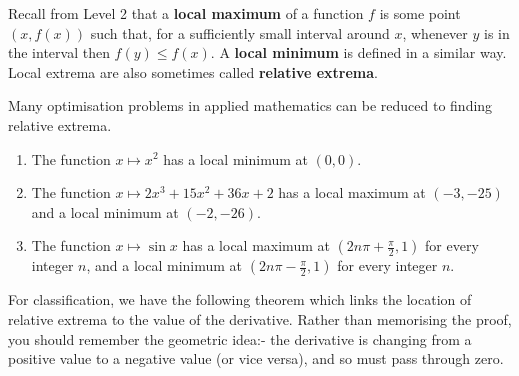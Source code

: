 


Recall from Level 2 that a \textbf{local maximum} of a function $ f $ is some point $ (x, f(x)) $ such that, for a sufficiently
small interval around $ x $, whenever $ y $ is in the interval then $ f(y) \leq f(x) $. A \textbf{local minimum} is defined in
a similar way. Local extrema are also sometimes called \textbf{relative extrema}.

Many optimisation problems in applied mathematics can be reduced to finding relative extrema.

\begin{exs}\leavevmode
  \begin{enumerate}
    \item The function $ x \mapsto x^2 $ has a local minimum at $ (0, 0) $.
    \item The function $ x \mapsto 2x^3 + 15x^2 + 36x + 2 $ has a local maximum at $ (-3, -25) $ and a local minimum at $ (-2, -26) $.
    \item The function $ x \mapsto \sin x $ has a local maximum at $ (2n\pi + \frac{\pi}{2}, 1) $ for every integer $ n $, and
          a local minimum at $ (2n\pi - \frac{\pi}{2}, 1) $ for every integer $ n $.
  \end{enumerate}
\end{exs}

For classification, we have the following theorem which links the location of relative extrema to the value of the derivative. Rather than
memorising the proof, you should remember the geometric idea:- the derivative is changing from a positive value to a negative value (or vice
versa), and so must pass through zero.

